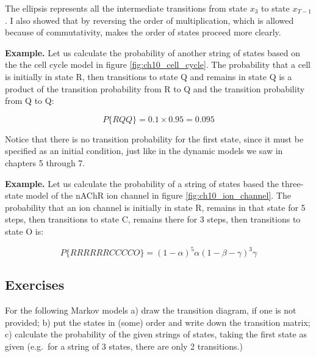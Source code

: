 \documentclass[
  letterpaper,
  DIV=11,
  numbers=noendperiod]{scrreprt}
\begin{document}
The ellipsis represents all the intermediate transitions from state
\(x_3\) to state \(x_{T-1}\). I also showed that by reversing the order
of multiplication, which is allowed because of commutativity, makes the
order of states proceed more clearly.

\textbf{Example.} Let us calculate the probability of another string of
states based on the the cell cycle model in figure
\ref{fig:ch10_cell_cycle}. The probability that a cell is initially in
state R, then transitions to state Q and remains in state Q is a product
of the transition probability from R to Q and the transition probability
from Q to Q:

\[ 
P\{RQQ\} = 0.1 \times 0.95=0.095
\]

Notice that there is no transition probability for the first state,
since it must be specified as an initial condition, just like in the
dynamic models we saw in chapters 5 through 7.

\textbf{Example.} Let us calculate the probability of a string of states
based the three-state model of the nAChR ion channel in figure
\ref{fig:ch10_ion_channel}. The probability that an ion channel is
initially in state R, remains in that state for 5 steps, then
transitions to state C, remains there for 3 steps, then transitions to
state O is:

\[ 
P\{RRRRRRCCCCO\} =  (1-\alpha)^5 \alpha (1-\beta-\gamma)^3 \gamma
\]

\hypertarget{exercises-27}{%
\subsection{Exercises}\label{exercises-27}}

For the following Markov models a) draw the transition diagram, if one
is not provided; b) put the states in (some) order and write down the
transition matrix; c) calculate the probability of the given strings of
states, taking the first state as given (e.g.~for a string of 3 states,
there are only 2 transitions.)
\end{document}
